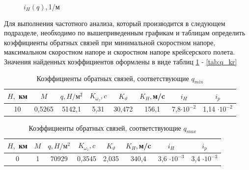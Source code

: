\begin{figure}[H]
        \caption{$i_H(q), $1/м}
        \label{fig:i_H}
    \end{figure} 
    

Для выполнения частотного анализа, который производится в следующем подразделе, необходимо по вышеприведенным графикам и таблицам определить коэффициенты обратных связей при минимальной скоростном напоре, максимальном скоростном напоре и скоростном напоре крейсерского полета. Значения найденных коэффициентов оформлены в виде таблиц \ref{tab:q_min} - \ref{tab:q_kr}


\begin{table}[H]
    \centering
    \caption{Коэффициенты обратных связей, соответствующие $q_{min}$}
    \begin{tabular}{|c|c|c|c|c|c|c|c|}
    \hline
        $H,$ км & $M$ & $q, H / \text{м}^2$ & $K_{\omega_z}, c$ & $K_\vartheta$ & $K_H,$м/c &$i_H$&$i_p$\\ \hline
        10& 0,5265& 5142,1  &5,31 & 30,472&156,1 &7,8$\cdot 10^{-2}$&1,14 $\cdot 10^{-2}$\\ \hline
    \end{tabular}
    \label{tab:q_min}
\end{table}

\begin{table}[H]
    \centering
    \caption{Коэффициенты обратных связей, соответствующие $q_{max}$}
    \begin{tabular}{|c|c|c|c|c|c|c|c|}
    \hline
        $H,$ км & $M$ & $q, H / \text{м}^2$ & $K_{\omega_z}, c$ & $K_\vartheta$ & $K_H,$м/c &$i_H$&$i_p$ \\ \hline
        0& 1 &70929 & 0,3545 & 2,035&340,4&3,6 $\cdot 10^{-3}$&3,4 $\cdot 10^{-3}$\\ \hline
    \end{tabular}
    \label{tab:q_max}
\end{table}


